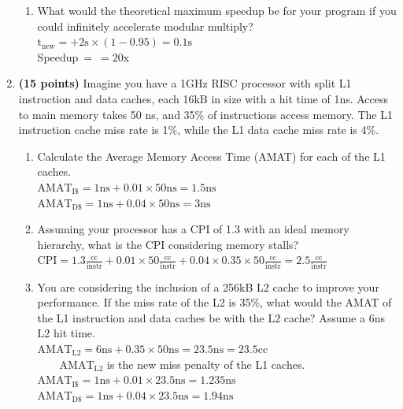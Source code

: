 \documentclass[11pt]{article}
\begin{document}
\begin{enumerate}
\begin{enumerate}
        \item What would the theoretical maximum speedup be for your program if you could infinitely accelerate modular multiply?\\[1em]
        $\mathrm{t_{new}=}$$+2\mathrm{s}\times (1-0.95)=0.1\mathrm{s}$\\[0.25em]
        Speedup$\ =$$\ =20$x\\
    \end{enumerate}
\newpage
    \item \textbf{(15 points)} Imagine you have a 1GHz RISC processor with split L1 instruction and data caches, each 16kB in size with a hit time of 1ns. Access to main memory takes 50 ns, and 35\% of instructions access memory. The L1 instruction cache miss rate is 1\%, while the L1 data cache miss rate is 4\%.
    \begin{enumerate}
        \item Calculate the Average Memory Access Time (AMAT) for each of the L1 caches.\\[1em]
        $\mathrm{AMAT_{I\$}=1ns+0.01\times 50ns=1.5ns}$\\[0.25em]
        $\mathrm{AMAT_{D\$}=1ns+0.04\times 50ns=3ns}$\\

        \item Assuming your processor has a CPI of 1.3 with an ideal memory hierarchy, what is the CPI considering memory stalls?\\[1em]
        $\mathrm{CPI=1.3\frac{cc}{instr}+0.01\times 50\frac{cc}{instr}+0.04\times 0.35\times 50\frac{cc}{instr}=2.5\frac{cc}{instr}}$\\

        \item You are considering the inclusion of a 256kB L2 cache to improve your performance. If the miss rate of the L2 is 35\%, what would the AMAT of the L1 instruction and data caches be with the L2 cache? Assume a 6ns L2 hit time.\\[1em]
        $\mathrm{AMAT_{L2}=6ns+0.35\times 50ns=23.5ns=23.5cc}$\\[0.25em]
        $\mathrm{\qquad AMAT_{L2}}$ is the new miss penalty of the L1 caches.\\[0.25em]
        $\mathrm{AMAT_{I\$}=1ns+0.01\times 23.5ns=1.235ns}$\\[0.25em]
        $\mathrm{AMAT_{D\$}=1ns+0.04\times 23.5ns=1.94ns}$\\


\end{enumerate}
\end{enumerate}
\end{document}
